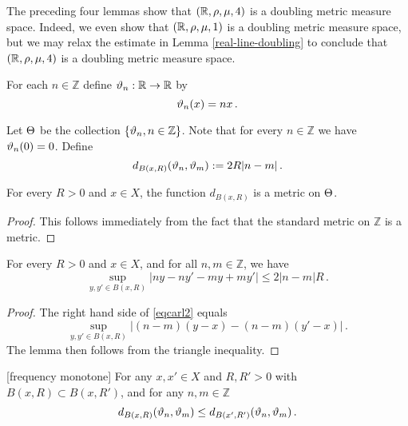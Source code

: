 {The preceding four lemmas show that $({\mathbb{R}}, \rho, \mu, 4)$ is a doubling metric measure space. Indeed, we even show
that $({\mathbb{R}}, \rho, \mu, 1)$ is a doubling metric measure space, but we may relax the estimate in Lemma \ref{real-line-doubling} to conclude that $({\mathbb{R}}, \rho, \mu, 4)$
is a doubling metric measure space.


For each $n\in \mathbb{Z}$ define
${\vartheta}_n:{\mathbb{R}}\to {\mathbb{R}}$ by
\begin{equation}
    {\vartheta}_n(x)=nx\, .
\end{equation}


Let ${\Theta}$ be the collection $\{{\vartheta}_n, n\in \mathbb{Z}\}$.
Note that for every $n\in \mathbb{Z}$ we have ${\vartheta}_n(0)=0$.
Define
\begin{equation}
    \label{eqcarl4}
    d_{B(x,R)}({\vartheta}_n, {\vartheta}_m) := 2R|n-m|\,.
\end{equation}

\begin{lemma}
    \label{frequency-metric}
    For every $R > 0$ and $x \in X$, the function $d_{B(x,R)}$ is a metric on ${\Theta}$.
\end{lemma}

\begin{proof}
    This follows immediately from the fact that the standard metric on $\mathbb{Z}$ is a metric.
\end{proof}

\begin{lemma}
    \label{oscillation-control}
    For every $R > 0$ and $x \in X$, and for all $n, m \in \mathbb{Z}$, we have
    \begin{equation}\label{eqcarl2}
       \sup_{y,y'\in B(x,R)}|ny-ny'-my+my'|\le 2|n-m|R\, .
    \end{equation}
\end{lemma}

\begin{proof}
    The right hand side of \eqref{eqcarl2} equals
    $$
        \sup_{y,y'\in B(x,R)}|(n-m)(y-x)-(n-m)(y'-x)|\,.
    $$
    The lemma then follows from the triangle inequality.
\end{proof}

\begin{lemma}{[frequency monotone]}
    For any $x, x' \in X$ and $R, R' > 0$ with $B(x,R) \subset B(x, R')$, and for any $n, m \in \mathbb{Z}$
    $$
        d_{B(x,R)}({\vartheta}_n, {\vartheta}_m) \le d_{B(x',R')}({\vartheta}_n, {\vartheta}_m)\,.
    $$
\end{lemma}

}
